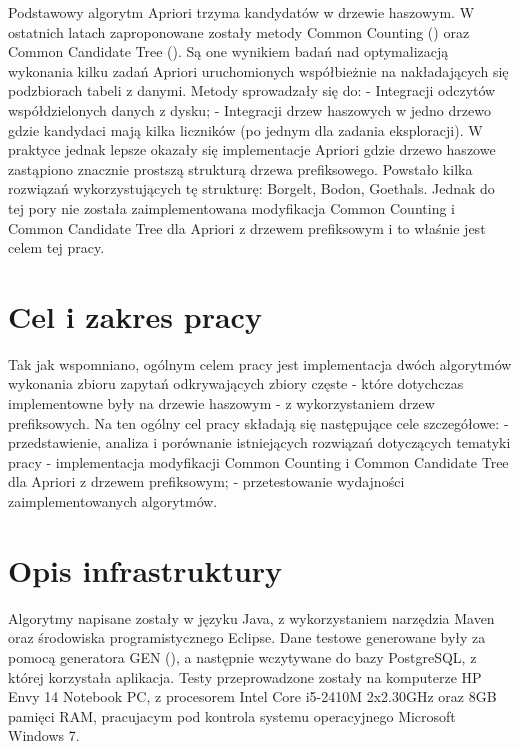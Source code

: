 Podstawowy algorytm Apriori trzyma kandydatów w drzewie haszowym. W ostatnich latach zaproponowane zostały metody Common Counting (\cite{WojciechowskiCC}) oraz Common Candidate Tree (\cite{WojciechowskiCCT}). Są one wynikiem badań nad optymalizacją wykonania kilku zadań Apriori uruchomionych współbieżnie na nakładających się podzbiorach tabeli z danymi. Metody sprowadzały się do:\newline
- Integracji odczytów współdzielonych danych z dysku;\newline
- Integracji drzew haszowych w jedno drzewo gdzie kandydaci mają kilka liczników (po jednym dla zadania eksploracji).\newline
W praktyce jednak lepsze okazały się implementacje Apriori gdzie drzewo haszowe zastąpiono znacznie prostszą strukturą drzewa prefiksowego. Powstało kilka rozwiązań wykorzystujących tę strukturę: Borgelt, Bodon, Goethals. Jednak do tej pory nie została zaimplementowana modyfikacja Common Counting i Common Candidate Tree dla Apriori z drzewem prefiksowym i to właśnie jest celem tej pracy. 

\section{Cel i zakres pracy}
\label{c12}

Tak jak wspomniano, ogólnym celem pracy jest implementacja dwóch algorytmów wykonania zbioru zapytań odkrywających zbiory częste - które dotychczas implementowne były na drzewie haszowym - z wykorzystaniem drzew prefiksowych. \newline
Na ten ogólny cel pracy składają się następujące cele szczegółowe:
- przedstawienie, analiza i porównanie istniejących rozwiązań dotyczących tematyki pracy
- implementacja modyfikacji Common Counting i Common Candidate Tree dla Apriori z drzewem prefiksowym;\newline
- przetestowanie wydajności zaimplementowanych algorytmów.\newline

\section{Opis infrastruktury}
\label{c13}
Algorytmy napisane zostały w języku Java, z wykorzystaniem narzędzia Maven oraz środowiska programistycznego Eclipse. Dane testowe generowane były za pomocą generatora GEN (\cite{AgrawalGEN}), a następnie wczytywane do bazy PostgreSQL, z której korzystała aplikacja. Testy przeprowadzone zostały na komputerze HP Envy 14 Notebook PC, z procesorem Intel Core i5-2410M 2x2.30GHz oraz 8GB pamięci RAM, pracujacym pod kontrola systemu operacyjnego Microsoft Windows 7. 
	
